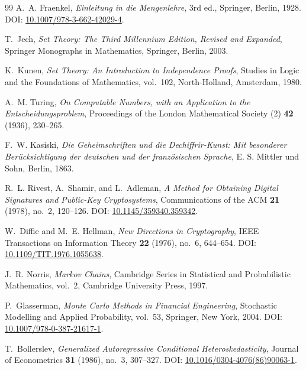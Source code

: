 \begin{thebibliography}{99}
A.~A. Fraenkel,
\emph{Einleitung in die Mengenlehre},
3rd ed., Springer, Berlin, 1928.
\newblock DOI: \href{https://doi.org/10.1007/978-3-662-42029-4}{10.1007/978-3-662-42029-4}.

T.~Jech,
\emph{Set Theory: The Third Millennium Edition, Revised and Expanded},
Springer Monographs in Mathematics,
Springer, Berlin, 2003.

K.~Kunen,
\emph{Set Theory: An Introduction to Independence Proofs},
Studies in Logic and the Foundations of Mathematics, vol.~102,
North-Holland, Amsterdam, 1980.

A.~M. Turing,
\emph{On Computable Numbers, with an Application to the Entscheidungsproblem},
Proceedings of the London Mathematical Society (2) \textbf{42} (1936), 230--265.

F.~W. Kasiski,
\emph{Die Geheimschriften und die Dechiffrir-Kunst: Mit besonderer Ber\"ucksichtigung der deutschen und der franz\"osischen Sprache},
E. S. Mittler und Sohn, Berlin, 1863.

R.~L. Rivest, A.~Shamir, and L.~Adleman,
\emph{A Method for Obtaining Digital Signatures and Public-Key Cryptosystems},
Communications of the ACM \textbf{21} (1978), no.~2, 120--126.
\newblock DOI: \href{https://doi.org/10.1145/359340.359342}{10.1145/359340.359342}.

W.~Diffie and M.~E. Hellman,
\emph{New Directions in Cryptography},
IEEE Transactions on Information Theory \textbf{22} (1976), no.~6, 644--654.
\newblock DOI: \href{https://doi.org/10.1109/TIT.1976.1055638}{10.1109/TIT.1976.1055638}.

J.~R. Norris,
\emph{Markov Chains},
Cambridge Series in Statistical and Probabilistic Mathematics, vol.~2,
Cambridge University Press, 1997.

P.~Glasserman,
\emph{Monte Carlo Methods in Financial Engineering},
Stochastic Modelling and Applied Probability, vol.~53,
Springer, New York, 2004.
\newblock DOI: \href{https://doi.org/10.1007/978-0-387-21617-1}{10.1007/978-0-387-21617-1}.

T.~Bollerslev,
\emph{Generalized Autoregressive Conditional Heteroskedasticity},
Journal of Econometrics \textbf{31} (1986), no.~3, 307--327.
\newblock DOI: \href{https://doi.org/10.1016/0304-4076(86)90063-1}{10.1016/0304-4076(86)90063-1}.


\end{thebibliography}
